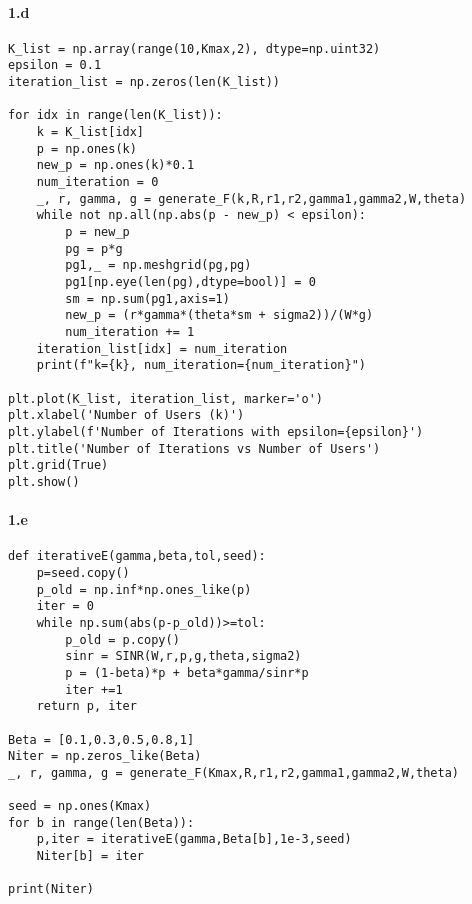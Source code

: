 \documentclass[a4paper,11pt,2]{article}
\begin{document}
\paragraph{1.d}
\begin{center}
\begin{lstlisting}
K_list = np.array(range(10,Kmax,2), dtype=np.uint32)
epsilon = 0.1
iteration_list = np.zeros(len(K_list))

for idx in range(len(K_list)):
    k = K_list[idx]
    p = np.ones(k)
    new_p = np.ones(k)*0.1
    num_iteration = 0
    _, r, gamma, g = generate_F(k,R,r1,r2,gamma1,gamma2,W,theta)
    while not np.all(np.abs(p - new_p) < epsilon):
        p = new_p
        pg = p*g
        pg1,_ = np.meshgrid(pg,pg)
        pg1[np.eye(len(pg),dtype=bool)] = 0
        sm = np.sum(pg1,axis=1)
        new_p = (r*gamma*(theta*sm + sigma2))/(W*g)
        num_iteration += 1
    iteration_list[idx] = num_iteration
    print(f"k={k}, num_iteration={num_iteration}")

plt.plot(K_list, iteration_list, marker='o')
plt.xlabel('Number of Users (k)')
plt.ylabel(f'Number of Iterations with epsilon={epsilon}')
plt.title('Number of Iterations vs Number of Users')
plt.grid(True)
plt.show()
\end{lstlisting}
\end{center}

\paragraph{1.e}
\begin{center}
\begin{lstlisting}
def iterativeE(gamma,beta,tol,seed):
    p=seed.copy()
    p_old = np.inf*np.ones_like(p)
    iter = 0
    while np.sum(abs(p-p_old))>=tol:
        p_old = p.copy()
        sinr = SINR(W,r,p,g,theta,sigma2)
        p = (1-beta)*p + beta*gamma/sinr*p
        iter +=1
    return p, iter

Beta = [0.1,0.3,0.5,0.8,1]
Niter = np.zeros_like(Beta)
_, r, gamma, g = generate_F(Kmax,R,r1,r2,gamma1,gamma2,W,theta)

seed = np.ones(Kmax)
for b in range(len(Beta)):
    p,iter = iterativeE(gamma,Beta[b],1e-3,seed)
    Niter[b] = iter

print(Niter)
\end{lstlisting}
\end{center}
\end{document}
